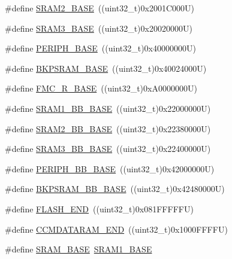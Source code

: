 \begin{DoxyCompactItemize}
\item 
\#define \hyperlink{group___peripheral__memory__map_gadbb42a3d0a8a90a79d2146e4014241b1}{S\+R\+A\+M2\+\_\+\+B\+A\+SE}~((uint32\+\_\+t)0x2001\+C000\+U)
\item 
\#define \hyperlink{group___peripheral__memory__map_gadb41012a2428a526d7ee5ff0f61d2344}{S\+R\+A\+M3\+\_\+\+B\+A\+SE}~((uint32\+\_\+t)0x20020000\+U)
\item 
\#define \hyperlink{group___peripheral__memory__map_ga9171f49478fa86d932f89e78e73b88b0}{P\+E\+R\+I\+P\+H\+\_\+\+B\+A\+SE}~((uint32\+\_\+t)0x40000000\+U)
\item 
\#define \hyperlink{group___peripheral__memory__map_ga52e57051bdf8909222b36e5408a48f32}{B\+K\+P\+S\+R\+A\+M\+\_\+\+B\+A\+SE}~((uint32\+\_\+t)0x40024000\+U)
\item 
\#define \hyperlink{group___peripheral__memory__map_ga7a599164cd92798542bc6288793d1ed5}{F\+M\+C\+\_\+\+R\+\_\+\+B\+A\+SE}~((uint32\+\_\+t)0x\+A0000000\+U)
\item 
\#define \hyperlink{group___peripheral__memory__map_gac4c4f61082e4b168f29d9cf97dc3ca5c}{S\+R\+A\+M1\+\_\+\+B\+B\+\_\+\+B\+A\+SE}~((uint32\+\_\+t)0x22000000\+U)
\item 
\#define \hyperlink{group___peripheral__memory__map_gac33cb6edadf184ab9860d77089503922}{S\+R\+A\+M2\+\_\+\+B\+B\+\_\+\+B\+A\+SE}~((uint32\+\_\+t)0x22380000\+U)
\item 
\#define \hyperlink{group___peripheral__memory__map_gaebfa4db60f9ac39c7c7f3fed98090410}{S\+R\+A\+M3\+\_\+\+B\+B\+\_\+\+B\+A\+SE}~((uint32\+\_\+t)0x22400000\+U)
\item 
\#define \hyperlink{group___peripheral__memory__map_gaed7efc100877000845c236ccdc9e144a}{P\+E\+R\+I\+P\+H\+\_\+\+B\+B\+\_\+\+B\+A\+SE}~((uint32\+\_\+t)0x42000000\+U)
\item 
\#define \hyperlink{group___peripheral__memory__map_gaee19a30c9fa326bb10b547e4eaf4e250}{B\+K\+P\+S\+R\+A\+M\+\_\+\+B\+B\+\_\+\+B\+A\+SE}~((uint32\+\_\+t)0x42480000\+U)
\item 
\#define \hyperlink{group___peripheral__memory__map_ga8be554f354e5aa65370f6db63d4f3ee4}{F\+L\+A\+S\+H\+\_\+\+E\+ND}~((uint32\+\_\+t)0x081\+F\+F\+F\+F\+F\+U)
\item 
\#define \hyperlink{group___peripheral__memory__map_ga9fbe263946209e6f09faf93512bd2f9a}{C\+C\+M\+D\+A\+T\+A\+R\+A\+M\+\_\+\+E\+ND}~((uint32\+\_\+t)0x1000\+F\+F\+F\+F\+U)
\item 
\#define \hyperlink{group___peripheral__memory__map_ga05e8f3d2e5868754a7cd88614955aecc}{S\+R\+A\+M\+\_\+\+B\+A\+SE}~\hyperlink{group___peripheral__memory__map_ga7d0fbfb8894012dbbb96754b95e562cd}{S\+R\+A\+M1\+\_\+\+B\+A\+SE}

\end{DoxyCompactItemize}
